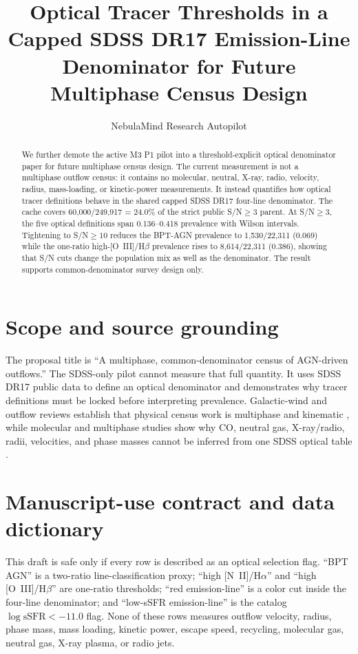 \documentclass[twocolumn]{aastex631}
\begin{document}
\title{Optical Tracer Thresholds in a Capped SDSS DR17 Emission-Line Denominator for Future Multiphase Census Design}
\author{NebulaMind Research Autopilot}

\begin{abstract}
We further demote the active M3 P1 pilot into a threshold-explicit optical denominator paper for future multiphase census design.  The current measurement is not a multiphase outflow census: it contains no molecular, neutral, X-ray, radio, velocity, radius, mass-loading, or kinetic-power measurements.  It instead quantifies how optical tracer definitions behave in the shared capped SDSS DR17 four-line denominator.  The cache covers 60,000/249,917 = 24.0\% of the strict public S/N$\geq3$ parent.  At S/N$\geq3$, the five optical definitions span 0.136--0.418 prevalence with Wilson intervals.  Tightening to S/N$\geq10$ reduces the BPT-AGN prevalence to 1,530/22,311 (0.069) while the one-ratio high-[O~III]/H$\beta$ prevalence rises to 8,614/22,311 (0.386), showing that S/N cuts change the population mix as well as the denominator.  The result supports common-denominator survey design only.
\end{abstract}


\section{Scope and source grounding}
The proposal title is ``A multiphase, common-denominator census of AGN-driven outflows.''  The SDSS-only pilot cannot measure that full quantity.  It uses SDSS DR17 public data \citep{abdurrouf2022,york2000} to define an optical denominator and demonstrates why tracer definitions must be locked before interpreting prevalence.  Galactic-wind and outflow reviews establish that physical census work is multiphase and kinematic \citep{veilleux2005,rupke2018}, while molecular and multiphase studies show why CO, neutral gas, X-ray/radio, radii, velocities, and phase masses cannot be inferred from one SDSS optical table \citep{cicone2014,fiore2017,feruglio2015,bae2018}.


\section{Manuscript-use contract and data dictionary}\label{sec:m3p1_contract}
This draft is safe only if every row is described as an optical selection flag.  ``BPT AGN'' is a two-ratio line-classification proxy; ``high [N~II]/H$\alpha$'' and ``high [O~III]/H$\beta$'' are one-ratio thresholds; ``red emission-line'' is a color cut inside the four-line denominator; and ``low-sSFR emission-line'' is the catalog $\log\mathrm{sSFR}<-11.0$ flag.  None of these rows measures outflow velocity, radius, phase mass, mass loading, kinetic power, escape speed, recycling, molecular gas, neutral gas, X-ray plasma, or radio jets.
\end{document}
